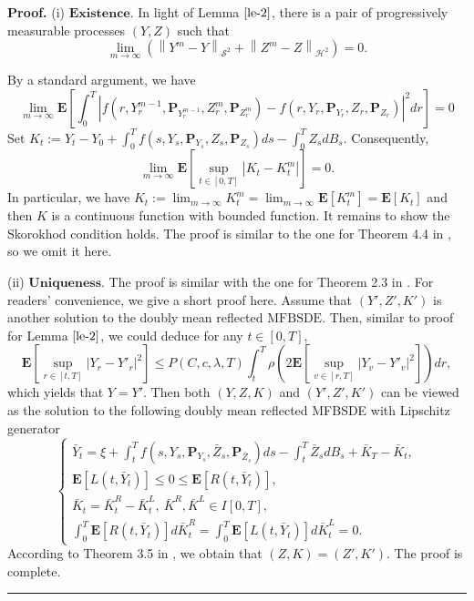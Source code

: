 \documentclass[10pt]{article}%
\numberwithin{equation}{section}
\newenvironment{proof}[1][Proof]{\noindent \textbf{#1.} }{\  \rule{0.5em}{0.5em}}
\def \P{\mathbf{P}}
\begin{document}
\begin{proof}
(i) $\textbf{Existence.}$ In light of Lemma $\ref{le-2}$, there is a pair of progressively measurable processes $(Y,Z)$ such that
\begin{equation*}\label{YZ}
 \lim_{m\rightarrow \infty} \left(\left \|Y^m-Y  \right \|_{\mathcal{S}^2}+\left \|Z^m-Z  \right \|_{\mathcal{H}^2}\right)=0.   
\end{equation*}

By a standard argument, we have
\begin{equation*}\label{fmf}
\lim_{m\rightarrow \infty}\mathbf{E}\left[\int_{0}^{T}\left|f(r,Y^{m-1}_r,\P_{Y^{m-1}_r}, Z_r^m,\P_{Z_r^m})-f(r,Y_r,\P_{Y_r}, Z_r,\P_{Z_r})\right|^2dr\right]=0   
\end{equation*}
Set $K_t:=Y_t-Y_0+\int_{0}^{T}f\left(s, Y_s,\P_{Y_s}, Z_s,\P_{Z_s}\right)ds-\int_{0}^{T}Z_sdB_s$. Consequently, 
\begin{equation*}\label{Km}
\lim_{m \rightarrow \infty}\mathbf{E}\left[\sup _{t \in[0,T]}\left|K_t-K_t^{m}\right|\right]=0.
\end{equation*}
In particular, we have $K_t:=\lim _{m \rightarrow \infty} K_t^{m}=\lim _{m \rightarrow \infty} \mathbf{E}\left[K_t^{m}\right]=\mathbf{E}\left[K_t\right]$ and then $K$ is a continuous function with bounded function. It remains to show the Skorokhod condition holds. The proof  is similar to the one for Theorem 4.4 in \cite{LS}, so we omit it here.

(ii) $\textbf{Uniqueness.}$ The proof is similar with the one for Theorem 2.3 in \cite{CZ}. For readers' convenience, we give a short proof here.  Assume that $(Y',Z',K')$ is another solution to the doubly mean reflected $\text{MFBSDE}$. Then, similar to proof for Lemma $\ref{le-2}$, we could deduce for any $t\in[0,T]$,
\begin{equation*}
    \mathbf{E}\left[\sup_{r\in[t,T]}\left|Y_r-Y'_r\right|^2\right]\leq P(C,c,\lambda,T)\int_{t}^{T}\rho\left(2\mathbf{E}\left[\sup_{v\in[r,T]}\left|Y_v-Y'_v\right|^2\right]\right)dr,
\end{equation*}
which yields that $Y=Y'$. Then both $(Y,Z,K)$ and $(Y',Z',K')$ can be viewed as the solution to the following doubly mean reflected MFBSDE with Lipschitz generator 
\begin{equation*}
\begin{cases}
\bar{Y}_t=\xi+\int_t^T f(s,Y_s,\P_{Y_s},\bar{Z}_s,\P_{\bar{Z}_s})ds-\int_t^T \bar{Z}_s dB_s+\bar{K}_T-\bar{K}_t, \\
\mathbf{E}[L(t,\bar{Y}_t)]\leq 0\leq \mathbf{E}[R(t,\bar{Y}_t)], \\
\bar{K}_t=\bar{K}^R_t-\bar{K}^L_t,\ \bar{K}^R,\bar{K}^L\in I[0,T], \\
\int_0^T \mathbf{E}[R(t,\bar{Y}_t)]d\bar{K}_t^R=\int_0^T \mathbf{E}[L(t,\bar{Y}_t)]d\bar{K}^L_t=0.
\end{cases}
\end{equation*}
According to Theorem 3.5 in \cite{LS}, we obtain that $(Z,K)=(Z',K')$. The proof is complete.
\end{proof}
\end{document}

